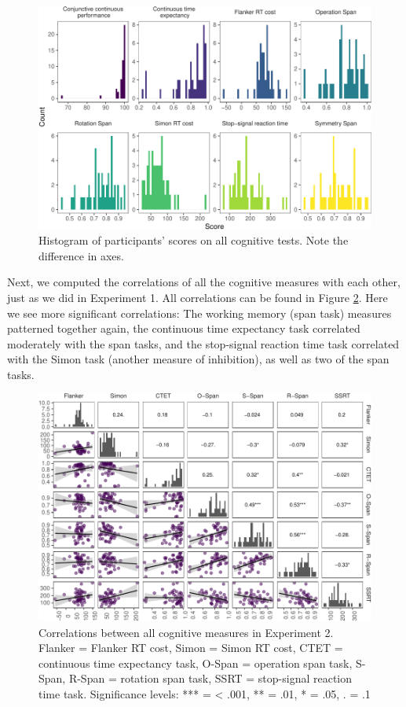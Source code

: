 \documentclass[
  man,floatsintext]{apa6}
\begin{document}
\begin{figure}
\centering
\includegraphics{task_difficulty_ind_dif_files/figure-latex/exp2hist-1.pdf}
\caption{\label{fig:exp2hist}Histogram of participants' scores on all cognitive tests. Note the difference in axes.}
\end{figure}

Next, we computed the correlations of all the cognitive measures with each other, just as we did in Experiment 1. All correlations can be found in Figure \ref{fig:cogskillscorE2}. Here we see more significant correlations: The working memory (span task) measures patterned together again, the continuous time expectancy task correlated moderately with the span tasks, and the stop-signal reaction time task correlated with the Simon task (another measure of inhibition), as well as two of the span tasks.



\begin{figure}
\centering
\includegraphics{task_difficulty_ind_dif_files/figure-latex/cogskillscorE2-1.pdf}
\caption{\label{fig:cogskillscorE2}Correlations between all cognitive measures in Experiment 2. Flanker = Flanker RT cost, Simon = Simon RT cost, CTET = continuous time expectancy task, O-Span = operation span task, S-Span, R-Span = rotation span task, SSRT = stop-signal reaction time task. Significance levels: *** = \textless{} .001, ** = .01, * = .05, . = .1}
\end{figure}
\end{document}
